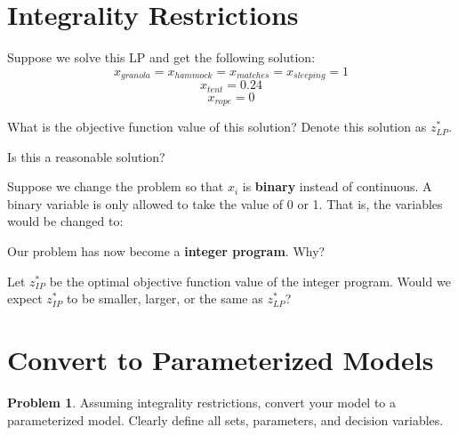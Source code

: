 \documentclass[12pt]{article}
\theoremstyle{definition}
\newtheorem{problem}{Problem}
\begin{document}
\vfill
\newpage

\section{Integrality Restrictions}

Suppose we solve this LP and get the following solution:
\[
x_{granola} = x_{hammock} = x_{matches} = x_{sleeping} = 1
\]
\[
x_{tent} = 0.24
\]
\[
x_{rope} = 0
\]

What is the objective function value of this solution? Denote this solution as $z^*_{LP}$. \vfill

Is this a reasonable solution? \vfill

Suppose we change the problem so that $x_i$ is \textbf{binary} instead of continuous. A binary variable is only allowed to take the value of 0 or 1. That is, the variables would be changed to: \vfill

Our problem has now become a \textbf{integer program}. Why? \vfill

Let $z^*_{IP}$ be the optimal objective function value of the integer program. Would we expect $z^*_{IP}$ to be smaller, larger, or the same as $z^*_{LP}$?

\vfill

\pagebreak
\section{Convert to Parameterized Models}
\begin{problem}
Assuming integrality restrictions, convert your model to a parameterized model.  Clearly define all sets, parameters, and decision variables. \\
\end{problem}
\end{document}
